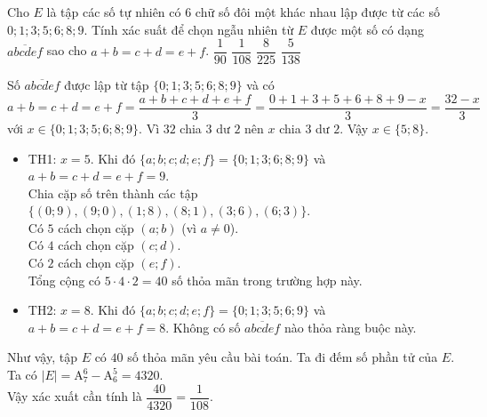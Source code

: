 \begin{bt}%
	Cho $E$ là tập các số tự nhiên có $6$ chữ số đôi một khác nhau lập được từ các số $0;1;3;5;6;8;9$. Tính xác suất để chọn ngẫu nhiên từ $E$ được một số có dạng $\overline{abcdef}$ sao cho $a+b=c+d=e+f$.
	\choice
	{$\dfrac{1}{90}$}
	{\True $\dfrac{1}{108}$}
	{$\dfrac{8}{225}$}
	{$\dfrac{5}{138}$}
	\loigiai
	{
		Số $\overline{abcdef}$	được lập từ tập $\{0;1;3;5;6;8;9\}$ và có\\ $a+b=c+d=e+f=\dfrac{a+b+c+d+e+f}{3}=\dfrac{0+1+3+5+6+8+9-x}{3}=\dfrac{32-x}{3}$ \\ với $x\in \{0;1;3;5;6;8;9\}$. Vì $32$ chia $3$ dư $2$ nên $x$ chia $3$ dư $2$. Vậy $x\in \{5;8\}$.
		\begin{itemize}
			\item TH1: $x=5$. Khi đó $\{a;b;c;d;e;f\}=\{0;1;3;6;8;9\}$ và $a+b=c+d=e+f=9$.\\
			Chia cặp số trên thành các tập $\{(0;9),(9;0),(1;8),(8;1),(3;6),(6;3)\}$.\\
			Có $5$ cách chọn cặp $(a;b)$ (vì $a\neq 0$).\\
			Có $4$ cách chọn cặp $(c;d)$.\\
			Có $2$ cách chọn cặp $(e;f)$.\\
			Tổng cộng có $5\cdot4\cdot2=40$ số thỏa mãn trong trường hợp này.
			\item TH2: $x=8$. Khi đó $\{a;b;c;d;e;f\}=\{0;1;3;5;6;9\}$ và $a+b=c+d=e+f=8$. Không có số $\overline{abcdef}$ nào thỏa ràng buộc này.
		\end{itemize}
		Như vậy, tập $E$ có $40$ số thỏa mãn yêu cầu bài toán.
		Ta đi đếm số phần tử của $E$. Ta có $\left| E\right|=\mathrm{A}_7^6-\mathrm{A}_6^5=4320$.\\
		Vậy xác xuất cần tính là $\dfrac{40}{4320}=\dfrac{1}{108}$.
	}
\end{bt}









